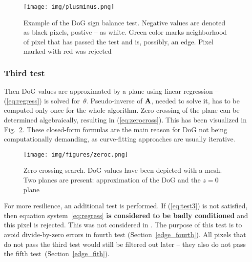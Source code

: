 \begin{figure}[ht]
	\centering\texttt{[image: img/plusminus.png]}
	\caption{ Example of the DoG sign balance test. Negative values are denoted as black pixels, postive -- as white. Green color marks neighborhood of pixel that has passed the test and is, possibly, an edge. Pixel marked with red was rejected }
	\label{fig:plusminus}
\end{figure}

\subsubsection*{Third test}
\label{edge_third}

Then DoG values are approximated by a plane using linear regression -- (\ref{eq:regress}) is solved for~$\theta$. Pseudo-inverse of $\textbf{A}$, needed to solve it, has to be computed only once for the whole algorithm. Zero-crossing of the plane can be determined algebraically, resulting in (\ref{eq:zerocross}). This has been visualized in Fig.~\ref{fig:zeroc}. These closed-form formulas are the main reason for DoG not being computationally demanding, as curve-fitting approaches are usually iterative.

\begin{figure}[ht]
	\centering\texttt{[image: img/figures/zeroc.png]}
	\caption{ Zero-crossing search. DoG values have been depicted with a mesh. Two planes are present: approximation of the DoG and the $z=0$ plane }
	\label{fig:zeroc}
\end{figure}

For more resilience, an additional test is performed. If (\ref{eq:test3}) is not satisfied, then equation system~\ref{eq:regress} \textbf{is considered to be badly conditioned} and this pixel is rejected. This was not considered in \cite{jose2015realtime}. The purpose of this test is to avoid divide-by-zero errors in fourth test (Section~\ref{edge_fourth}). All pixels that do not pass the third test would still be filtered out later -- they also do not pass the fifth test~(Section~\ref{edge_fith}).

